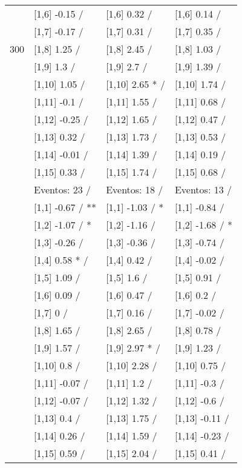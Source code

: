\begin{table}
\begin{tabular}[t]{llll}
 & {}[1,6] -0.15  / & {}[1,6] 0.32  / & {}[1,6] 0.14  /\\
 & {}[1,7] -0.17  / & {}[1,7] 0.31  / & {}[1,7] 0.35  /\\
300 & {}[1,8] 1.25  / & {}[1,8] 2.45  / & {}[1,8] 1.03  /\\
\addlinespace
 & {}[1,9] 1.3  / & {}[1,9] 2.7  / & {}[1,9] 1.39  /\\
 & {}[1,10] 1.05  / & {}[1,10] 2.65 * / & {}[1,10] 1.74  /\\
 & {}[1,11] -0.1  / & {}[1,11] 1.55  / & {}[1,11] 0.68  /\\
 & {}[1,12] -0.25  / & {}[1,12] 1.65  / & {}[1,12] 0.47  /\\
 & {}[1,13] 0.32  / & {}[1,13] 1.73  / & {}[1,13] 0.53  /\\
\addlinespace
 & {}[1,14] -0.01  / & {}[1,14] 1.39  / & {}[1,14] 0.19  /\\
 & {}[1,15] 0.33  / & {}[1,15] 1.74  / & {}[1,15] 0.68  /\\
 & Eventos:  23 / & Eventos:  18 / & Eventos:  13 /\\
 & {}[1,1] -0.67  / ** & {}[1,1] -1.03  / * & {}[1,1] -0.84  /\\
 & {}[1,2] -1.07  / * & {}[1,2] -1.16  / & {}[1,2] -1.68  / *\\
\addlinespace
 & {}[1,3] -0.26  / & {}[1,3] -0.36  / & {}[1,3] -0.74  /\\
 & {}[1,4] 0.58 * / & {}[1,4] 0.42  / & {}[1,4] -0.02  /\\
 & {}[1,5] 1.09  / & {}[1,5] 1.6  / & {}[1,5] 0.91  /\\
 & {}[1,6] 0.09  / & {}[1,6] 0.47  / & {}[1,6] 0.2  /\\
 & {}[1,7] 0  / & {}[1,7] 0.16  / & {}[1,7] -0.02  /\\
\addlinespace
500 & {}[1,8] 1.65  / & {}[1,8] 2.65  / & {}[1,8] 0.78  /\\
 & {}[1,9] 1.57  / & {}[1,9] 2.97 * / & {}[1,9] 1.23  /\\
 & {}[1,10] 0.8  / & {}[1,10] 2.28  / & {}[1,10] 0.75  /\\
 & {}[1,11] -0.07  / & {}[1,11] 1.2  / & {}[1,11] -0.3  /\\
 & {}[1,12] -0.07  / & {}[1,12] 1.32  / & {}[1,12] -0.6  /\\
\addlinespace
 & {}[1,13] 0.4  / & {}[1,13] 1.75  / & {}[1,13] -0.11  /\\
 & {}[1,14] 0.26  / & {}[1,14] 1.59  / & {}[1,14] -0.23  /\\
 & {}[1,15] 0.59  / & {}[1,15] 2.04  / & {}[1,15] 0.41  /\\
\bottomrule
\end{tabular}
\end{table}
